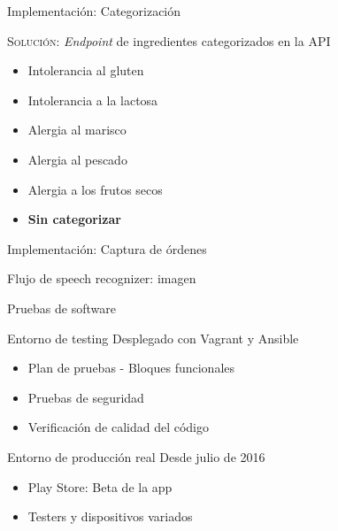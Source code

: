 \documentclass[10pt,xcolor=svgnames]{beamer}
\begin{document}
\begin{frame}{Implementación: Categorización}

  \textcolor{naranja}{\textsc{Solución}}: \textit{Endpoint} de ingredientes
  categorizados en la API

  \begin{itemize}
  \item Intolerancia al gluten
  \item Intolerancia a la lactosa
  \item Alergia al marisco
  \item Alergia al pescado
  \item Alergia a los frutos secos
  \item \textbf{Sin categorizar}
  \end{itemize}
  
\end{frame}


\begin{frame}{Implementación: Captura de órdenes}

  Flujo de speech recognizer: imagen
  
\end{frame}

\begin{frame}{Pruebas de software}

  \begin{block}{Entorno de testing}
    Desplegado con Vagrant y Ansible
    
    \begin{itemize}
    \item Plan de pruebas - Bloques funcionales
    \item Pruebas de seguridad
    \item Verificación de calidad del código
    \end{itemize}
  \end{block}
      
  \begin{block}{Entorno de producción real}
    Desde julio de 2016
    \begin{itemize}
    \item Play Store: Beta de la app
    \item Testers y dispositivos variados
    \end{itemize}
  \end{block}
  
\end{frame}


\end{document}
